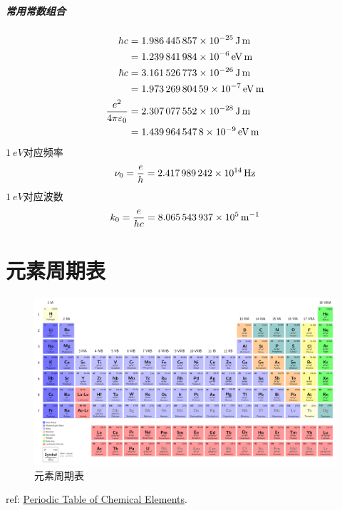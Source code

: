 \paragraph{常用常数组合}
\begin{align}
	hc&=\SI{1.986445857E-25}{J.m}\\ %
	&=\SI{1.239841984E-6}{eV.m}\\  %
	\hbar c&=\SI{3.161526773E-26}{J.m}\\ %
	&=\SI{1.97326980459E-7}{eV.m}\\ %
	\frac{e^2}{4\pi\varepsilon_0}&=\SI{2.307077552E-28}{J.m}\\ %
	&=\SI{1.4399645478E-9}{eV.m} %
\end{align}
$\SI{1}{eV}$对应频率
\begin{equation}
	\nu_0=\frac eh=\SI{2.417989242E14}{Hz}
\end{equation} %
$\SI{1}{eV}$对应波数
\begin{equation}
	k_0=\frac e{hc}=\SI{8.065543937E5}{m^{-1}}
\end{equation} %

\chapter{元素周期表}

\begin{figure}[h]
	\centering
	\includegraphics[width=\linewidth]{figures/tikz/periodic_table.pdf}
	\caption{元素周期表}
	\label{fig:periodic_table}
\end{figure}

ref: \href{https://texample.net/tikz/examples/periodic-table-of-chemical-elements}{Periodic Table of Chemical Elements}.

